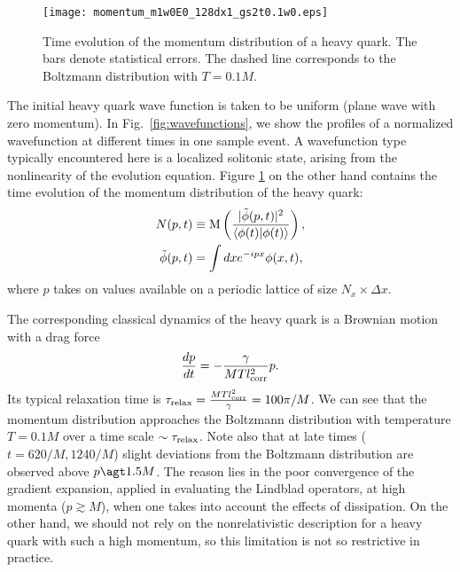 \documentclass[prd,11pt, amsmath, amsymb, aps, reprint, tightenlines, nofootinbib, longbibliography, abbrv, preprintnumbers]{revtex4-1}
\begin{document}
\begin{figure}
\texttt{[image: momentum\_m1w0E0\_128dx1\_gs2t0.1w0.eps]}
\caption{
Time evolution of the momentum distribution of a heavy quark.
The bars denote statistical errors.
The dashed line corresponds to the Boltzmann distribution with $T=0.1M$.
}
\label{fig:free_pdist}
\end{figure}

The initial heavy quark wave function is taken to be uniform (plane wave with zero momentum).
In Fig.~\ref{fig:wavefunctions}, we show the profiles of a normalized wavefunction at different times in one sample event.
A wavefunction type typically encountered here is a localized solitonic state, arising from the nonlinearity of the evolution equation.
Figure \ref{fig:free_pdist} on the other hand contains the time evolution of the momentum distribution of the heavy quark:
\begin{subequations}
\begin{align}
N(p,t) &\equiv {\rm M}\left(\frac{|\tilde\phi(p,t)|^2}{\langle\phi(t)|\phi(t)\rangle}\right),\\
\tilde\phi(p,t)&=\int dx e^{-ipx}\phi(x,t),
\end{align}
\end{subequations}
where $p$ takes on values available on a periodic lattice of size $N_x\times \Delta x$.

The corresponding classical dynamics of the heavy quark is a Brownian motion with a drag force
\begin{align}
\frac{dp}{dt} = -\frac{\gamma}{MTl_{\rm corr}^2} p.
\end{align}
Its typical relaxation time is $\tau_{\rm relax} = \frac{MTl_{\rm corr}^2}{\gamma}=100\pi/M$.
We can see that the momentum distribution approaches the Boltzmann distribution with temperature $T=0.1M$ over a time scale $\sim \tau_{\rm relax}$.
Note also that at late times ($t=620/M, 1240/M$) slight deviations from the Boltzmann distribution are observed above $p\agt 1.5M$.
The reason lies in the poor convergence of the gradient expansion, applied in evaluating the Lindblad operators, at high momenta ($p\gtrsim M$), when one takes into account the effects of dissipation.
On the other hand, we should not rely on the nonrelativistic description for a heavy quark with such a high momentum, so this limitation is not so restrictive in practice.
\end{document}
